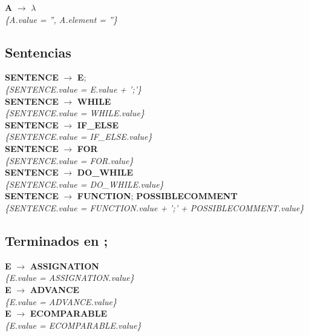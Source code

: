 \documentclass[10pt,a4paper]{article}
\begin{document}
\textbf{A} $\rightarrow$ $\lambda$ \\
\textit{\{A.value = '', A.element = ''\}} \\

\subsection{Sentencias}
\textbf{SENTENCE} $\rightarrow$ \textbf{E};\\ 
\textit{\{SENTENCE.value = E.value + ';'\}} \\

\textbf{SENTENCE} $\rightarrow$ \textbf{WHILE} \\ 
\textit{\{SENTENCE.value = WHILE.value\}} \\

\textbf{SENTENCE} $\rightarrow$ \textbf{IF\_ELSE}  \\ 
\textit{\{SENTENCE.value = IF\_ELSE.value\}} \\

\textbf{SENTENCE} $\rightarrow$ \textbf{FOR} \\ 
\textit{\{SENTENCE.value = FOR.value\}} \\

\textbf{SENTENCE} $\rightarrow$ \textbf{DO\_WHILE} \\ 
\textit{\{SENTENCE.value = DO\_WHILE.value\}}  \\

\textbf{SENTENCE} $\rightarrow$ \textbf{FUNCTION}; \textbf{POSSIBLECOMMENT} \\
\textit{\{SENTENCE.value = FUNCTION.value + ';' + POSSIBLECOMMENT.value\}} \\

\subsection{Terminados en ;}

\textbf{E} $\rightarrow$ \textbf{ASSIGNATION}\\
\textit{\{E.value = ASSIGNATION.value\}}\\

\textbf{E} $\rightarrow$ \textbf{ADVANCE}\\
\textit{\{E.value = ADVANCE.value\}}\\

\textbf{E} $\rightarrow$ \textbf{ECOMPARABLE}\\
\textit{\{E.value = ECOMPARABLE.value\}}\\
\end{document}
